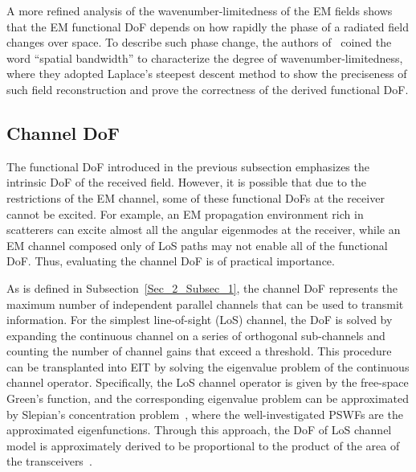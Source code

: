 \documentclass[journal,twocolumn]{IEEEtran}
\begin{document}
A more refined analysis of the wavenumber-limitedness of the EM fields shows that the EM functional DoF depends on how rapidly the phase of a radiated field changes over space. 
To describe such phase change, the authors of~\cite{bucci1987spatial} coined the word ``spatial bandwidth'' to characterize the degree of wavenumber-limitedness, where they adopted Laplace's steepest descent method to show the preciseness of such field reconstruction and prove the correctness of the derived functional DoF. 


\subsection{Channel DoF}
The functional DoF introduced in the previous subsection emphasizes the intrinsic DoF of the received field. 
However, it is possible that due to the restrictions of the EM channel, some of these functional DoFs at the receiver cannot be excited. For example, an EM propagation environment rich in scatterers can excite almost all the angular eigenmodes at the receiver, while an EM channel composed only of LoS paths may not enable all of the functional DoF. Thus, evaluating the channel DoF is of practical importance.  

As is defined in Subsection~\ref{Sec_2_Subsec_1}, the channel DoF represents the maximum number of independent parallel channels that can be used to transmit information. 
For the simplest line-of-sight (LoS) channel, the DoF is solved by expanding the continuous channel on a series of orthogonal sub-channels and counting the number of channel gains that exceed a threshold. 
This procedure can be transplanted into EIT by solving the eigenvalue problem of the continuous channel operator. 
Specifically, the LoS channel operator is given by the free-space Green's function, and the corresponding eigenvalue problem can be approximated by Slepian's concentration problem~\cite{miller2000communicating}, where the well-investigated PSWFs are the approximated eigenfunctions.  
Through this approach, the DoF of LoS channel model is approximately derived to be proportional to the product of the area of the transceivers~\cite{pizzo2022nyquist,miller2000communicating}. 
\end{document}
